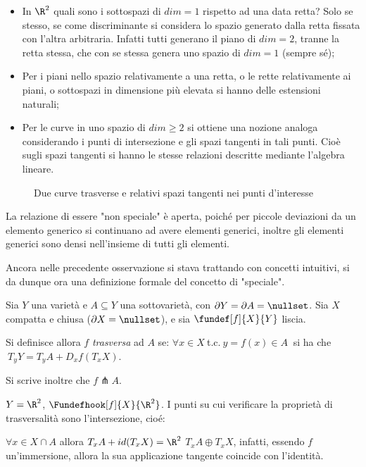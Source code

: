 \begin{es}
\begin{itemize}
\item In $\R^2$ quali sono i sottospazi di $dim = 1$ rispetto ad una data retta? Solo se stesso, se come discriminante si considera lo spazio generato dalla retta fissata con l'altra arbitraria. Infatti tutti generano il piano di $dim = 2$, tranne la retta stessa, che con se stessa genera uno spazio di $dim = 1$ (sempre sé);
\item Per i piani nello spazio relativamente a una retta, o le rette relativamente ai piani, o sottospazi in dimensione più elevata si hanno delle estensioni naturali;
\item Per le curve in uno spazio di $dim \geq 2$ si ottiene una nozione analoga considerando i punti di intersezione e gli spazi tangenti in tali punti. Cioè sugli spazi tangenti si hanno le stesse relazioni descritte mediante l'algebra lineare.
\end{itemize}

\begin{figure}[h]
\centering

\caption{Due curve trasverse e relativi spazi tangenti nei punti d'interesse}
\end{figure}
\end{es}

\begin{oss}
La relazione di essere "non speciale" è aperta, poiché per piccole deviazioni da un elemento generico si continuano ad avere elementi generici, inoltre gli elementi generici sono densi nell'insieme di tutti gli elementi.
\end{oss}

Ancora nelle precedente osservazione si stava trattando con concetti intuitivi, si da dunque ora una definizione formale del concetto di "speciale".

\begin{defn}[Trasversalità]
Sia $Y$ una varietà e $A\subseteq Y$ una sottovarietà, con $\partial Y = \partial A = \nullset$. Sia $X$ compatta e chiusa ($\partial X = \nullset$), e sia $\fundef[f]{X}{Y}$ liscia.

Si definisce allora $f$ \emph{trasversa} ad $A$ se: $\forall x \in X~$t.c.$~y = f(x) \in A~$ si ha che $~T_yY = T_yA + D_xf(T_xX)$.

Si scrive inoltre che $f \pitchfork A$.
\end{defn}

\begin{es}
$Y = \R^2$, $\Fundefhook[f]{X}{\R^2}$. I punti su cui verificare la proprietà di trasversalità sono l'intersezione, cioé:

$\forall x \in X \cap A$ allora $T_xA + id(T_xX) = \R^2$ \iff $T_xA \oplus T_xX$, infatti, essendo $f$ un'immersione, allora la sua applicazione tangente coincide con l'identità.
\end{es}

